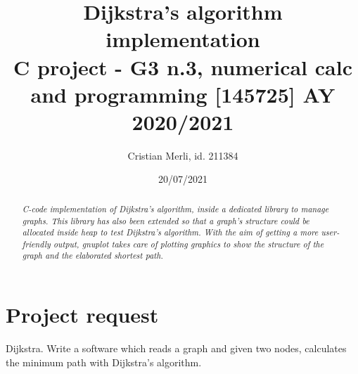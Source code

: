 \documentclass{article}                                                                                                     %
\title{Dijkstra's algorithm implementation \\                                                                               %
\large C project - G3 n.3, numerical calc and programming [145725] AY 2020/2021}                                            %
\author{Cristian Merli, id. 211384}                                                                                         %
\date{20/07/2021}                                                                                                           %
\begin{document}

\maketitle                                                                                                                  %

\vspace{1cm}                                                                                                                %
  \begin{abstract}                                                                                                          %
    \noindent \textit{C-code implementation of Dijkstra's algorithm, inside a dedicated library to manage graphs.           %
    This library has also been extended so that a graph's structure could be allocated inside heap to test
    Dijkstra’s algorithm. With the aim of getting a more user-friendly output, gnuplot takes care of plotting graphics
    to show the structure of the graph and the elaborated shortest path.}
  \end{abstract}                                                                                                            %
\vspace{3.5cm}                                                                                                              %

\vspace{3.5cm}                                                                                                              %
  \tableofcontents                                                                                                          %
\pagebreak                                                                                                                  %

\section{Project request}                                                                                                   %
\label{sec:project_request}                                                                                                 %
  Dijkstra. Write a software which reads a graph and given two nodes, calculates the minimum path with Dijkstra’s           %
  algorithm.
\end{document}
